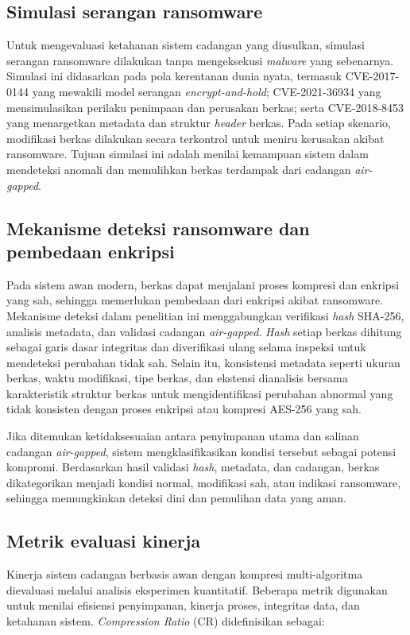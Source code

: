 \documentclass{iaesarticle}
\begin{document}
\subsection{Simulasi serangan ransomware}
Untuk mengevaluasi ketahanan sistem cadangan yang diusulkan, simulasi serangan ransomware dilakukan tanpa mengeksekusi \textit{malware} yang sebenarnya. Simulasi ini didasarkan pada pola kerentanan dunia nyata, termasuk CVE-2017-0144 yang mewakili model serangan \textit{encrypt-and-hold}; CVE-2021-36934 yang mensimulasikan perilaku penimpaan dan perusakan berkas; serta CVE-2018-8453 yang menargetkan metadata dan struktur \textit{header} berkas. Pada setiap skenario, modifikasi berkas dilakukan secara terkontrol untuk meniru kerusakan akibat ransomware. Tujuan simulasi ini adalah menilai kemampuan sistem dalam mendeteksi anomali dan memulihkan berkas terdampak dari cadangan \textit{air-gapped}.

\subsection{Mekanisme deteksi ransomware dan pembedaan enkripsi}
Pada sistem awan modern, berkas dapat menjalani proses kompresi dan enkripsi yang sah, sehingga memerlukan pembedaan dari enkripsi akibat ransomware. Mekanisme deteksi dalam penelitian ini menggabungkan verifikasi \textit{hash} SHA-256, analisis metadata, dan validasi cadangan \textit{air-gapped}. \textit{Hash} setiap berkas dihitung sebagai garis dasar integritas dan diverifikasi ulang selama inspeksi untuk mendeteksi perubahan tidak sah. Selain itu, konsistensi metadata seperti ukuran berkas, waktu modifikasi, tipe berkas, dan ekstensi dianalisis bersama karakteristik struktur berkas untuk mengidentifikasi perubahan abnormal yang tidak konsisten dengan proses enkripsi atau kompresi AES-256 yang sah.

Jika ditemukan ketidaksesuaian antara penyimpanan utama dan salinan cadangan \textit{air-gapped}, sistem mengklasifikasikan kondisi tersebut sebagai potensi kompromi. Berdasarkan hasil validasi \textit{hash}, metadata, dan cadangan, berkas dikategorikan menjadi kondisi normal, modifikasi sah, atau indikasi ransomware, sehingga memungkinkan deteksi dini dan pemulihan data yang aman.

\subsection{Metrik evaluasi kinerja}
Kinerja sistem cadangan berbasis awan dengan kompresi multi-algoritma dievaluasi melalui analisis eksperimen kuantitatif. Beberapa metrik digunakan untuk menilai efisiensi penyimpanan, kinerja proses, integritas data, dan ketahanan sistem. \textit{Compression Ratio} (CR) didefinisikan sebagai:
\end{document}
